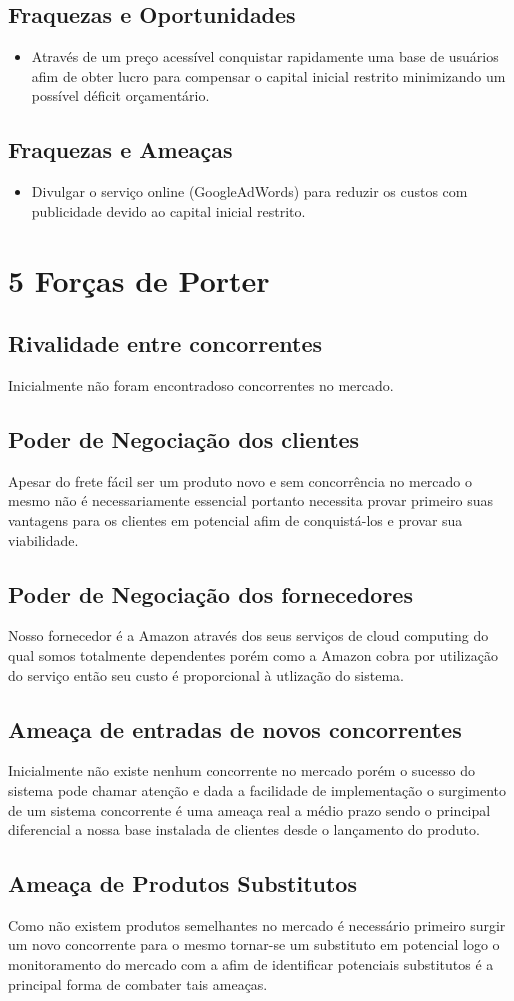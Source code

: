 \subsection{Fraquezas e Oportunidades}
\begin{itemize}
\item Através de um preço acessível conquistar rapidamente  uma base de usuários afim de obter lucro para compensar o capital inicial restrito minimizando um possível déficit orçamentário.
\end{itemize}
\subsection{Fraquezas e Ameaças}
\begin{itemize}
\item Divulgar o serviço online (GoogleAdWords) para reduzir os custos com publicidade devido ao capital inicial restrito.
\end{itemize}

\section{5 Forças de Porter}
\subsection{Rivalidade entre concorrentes}
Inicialmente não foram encontradoso concorrentes no mercado.
\subsection{Poder de Negociação dos clientes}
Apesar do frete fácil ser um produto novo e sem concorrência no mercado o mesmo  não é necessariamente essencial portanto necessita provar primeiro suas vantagens para os clientes em potencial afim de  conquistá-los e provar sua viabilidade.
\subsection{Poder de Negociação dos fornecedores}
  Nosso fornecedor é a Amazon através dos seus serviços de cloud computing do qual somos totalmente dependentes porém como a Amazon cobra por utilização do serviço então seu custo é proporcional à utlização do sistema.
\subsection{Ameaça de entradas de novos concorrentes}
Inicialmente não existe nenhum concorrente no mercado porém  o sucesso do sistema pode chamar atenção e  dada a facilidade de implementação o surgimento de um sistema concorrente é uma ameaça real a médio prazo sendo o principal diferencial a nossa base instalada de clientes desde o lançamento do produto.
\subsection{Ameaça de Produtos Substitutos}
	Como não existem produtos semelhantes no mercado é necessário primeiro surgir um novo concorrente para o mesmo tornar-se  um substituto em potencial logo  o monitoramento do mercado com a afim de  identificar potenciais substitutos é  a principal forma de combater tais ameaças.
